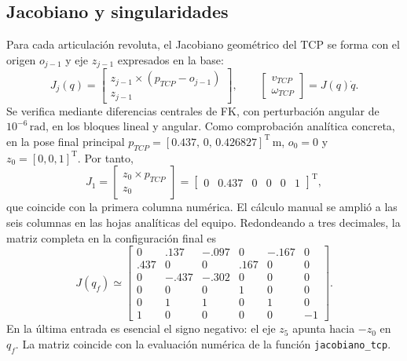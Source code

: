 \documentclass[conference,letterpaper]{IEEEtran}
\newcommand{\trans}{\mathrm{T}}
\begin{document}
	\subsection{Jacobiano y singularidades}
	Para cada articulación revoluta, el Jacobiano geométrico del TCP se forma con el origen \(o_{j-1}\) y eje \(z_{j-1}\) expresados en la base:
	\begin{equation}
		J_j(q)=\begin{bmatrix}
			z_{j-1}\times(p_{TCP}-o_{j-1})\\z_{j-1}
		\end{bmatrix},\qquad
		\begin{bmatrix}v_{TCP}\\\omega_{TCP}\end{bmatrix}=J(q)\dot q.
		\label{eq:jac}
	\end{equation}
	Se verifica mediante diferencias centrales de FK, con perturbación angular de \(10^{-6}\,\mathrm{rad}\), en los bloques lineal y angular. Como comprobación analítica concreta, en la pose final principal \(p_{TCP}=[0.437,\,0,\,0.426827]^\trans\,\mathrm{m}\), \(o_0=0\) y \(z_0=[0,0,1]^\trans\). Por tanto,
	\begin{equation}
		J_1=\begin{bmatrix}z_0\times p_{TCP}\\z_0\end{bmatrix}
		=\begin{bmatrix}0&0.437&0&0&0&1\end{bmatrix}^{\!\trans},
		\label{eq:manualjac}
	\end{equation}
	que coincide con la primera columna numérica. El cálculo manual se amplió a las seis columnas en las hojas
	analíticas del equipo. Redondeando a tres decimales,
	la matriz completa en la configuración final es
	{\setlength{\arraycolsep}{2.8pt}
		\begin{equation}
			J(q_f)\simeq
			\begin{bmatrix}
				0 & .137 & -.097 & 0 & -.167 & 0\\
				.437 & 0 & 0 & .167 & 0 & 0\\
				0 & -.437 & -.302 & 0 & 0 & 0\\
				0 & 0 & 0 & 1 & 0 & 0\\
				0 & 1 & 1 & 0 & 1 & 0\\
				1 & 0 & 0 & 0 & 0 & -1
			\end{bmatrix}.
			\label{eq:jcompleto}
	\end{equation}}
	En la última entrada es esencial el signo negativo: el eje
	\(z_5\) apunta hacia \(-z_0\) en \(q_f\). La matriz coincide
	con la evaluación numérica de la función \texttt{jacobiano\_tcp}.
	
\end{document}

